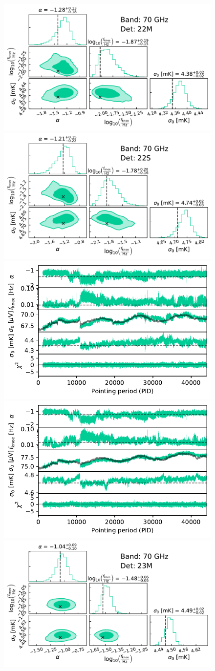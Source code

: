 \documentclass{aa}
\begin{document}
\begin{figure}[p]
        \begin{center}
                \includegraphics[width=0.495\linewidth]{figs/corner_band_070_det_9_mean_new.pdf}
                \includegraphics[width=0.495\linewidth]{figs/corner_band_070_det_10_mean_new.pdf}\\
                \includegraphics[width=0.495\linewidth]{figs/xi_vs_pid_band_070_det_9_mean_new.pdf}
                \includegraphics[width=0.495\linewidth]{figs/xi_vs_pid_band_070_det_10_mean_new.pdf}\\
                \vspace*{0.5mm}
                \includegraphics[width=0.495\linewidth]{figs/corner_band_070_det_11_mean_new.pdf}

\end{center}
\end{figure}
\end{document}
